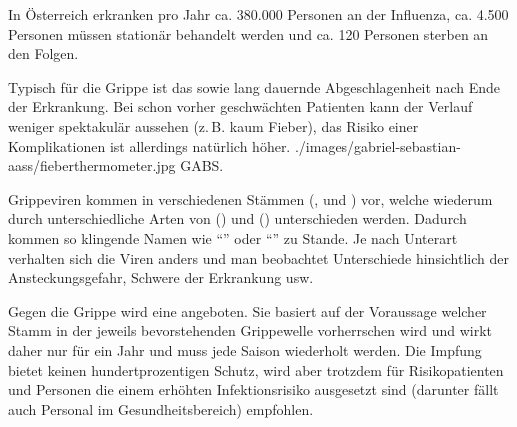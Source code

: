 In Österreich erkranken pro Jahr ca. 380.000 Personen an der
Influenza, ca. 4.500 Personen müssen stationär behandelt werden und
ca. 120 Personen sterben an den
Folgen\cite{Strauss0000}.



{%
Typisch für die Grippe ist das  sowie lang dauernde Abgeschlagenheit nach
Ende der Erkrankung. Bei schon vorher geschwächten
Patienten kann der Verlauf weniger spektakulär aussehen (z.\,B. kaum Fieber), das Risiko einer Komplikationen ist allerdings natürlich höher. 
}
{
}
{./images/gabriel-sebastian-aass/fieberthermometer.jpg}
{}
{GABS.}


{
Grippeviren kommen in verschiedenen
Stämmen (,  und ) vor, welche
wiederum durch unterschiedliche Arten von
 () und 
() unterschieden werden. Dadurch kommen so
klingende Namen wie "`"' oder
"`"' zu Stande. Je nach Unterart verhalten sich die Viren anders und man beobachtet Unterschiede hinsichtlich der
Ansteckungsgefahr, Schwere der Erkrankung usw. 
\Z{}
}
{

}
{}
{}
{}

{
Gegen die Grippe wird eine
 angeboten. Sie basiert auf der Voraussage
welcher Stamm in der jeweils bevorstehenden Grippewelle
vorherrschen wird und wirkt daher nur für ein Jahr und muss
jede Saison wiederholt werden. Die Impfung bietet keinen
hundertprozentigen Schutz, wird aber trotzdem für
Risikopatienten und Personen die einem erhöhten
Infektionsrisiko ausgesetzt sind (darunter fällt auch
Personal im Gesundheitsbereich) empfohlen.
}
{
}
{}
{}
{}

\cite{Gallaher2009,H1N1InvTeam2009,Peiris2009,Wolf2009,Cutler2009}



